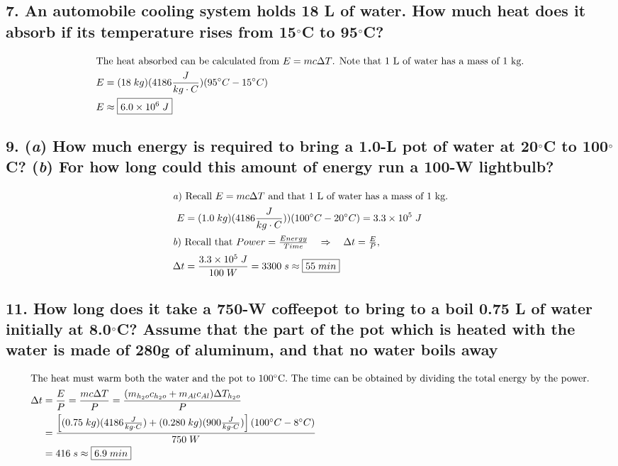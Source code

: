 \documentclass{article}
\newcommand\rr{\quad\Rightarrow\quad}
\begin{document}
\subsection*{7. An automobile cooling system holds 18 L of water. How much heat does it absorb if its temperature rises from 15$\degree$C to 95$\degree$C?}

\begin{align*}
    \intertext{The heat absorbed can be calculated from $E=mc\Delta T$. Note that 1 L of water has a mass of 1 kg.}
    E &= (18\;kg)(4186\frac{J}{kg\cdot C})(95\degree C - 15\degree C) \\  
    E &\approx \boxed{6.0 \times 10^6\;J} \\
\end{align*}

\subsection*{9. (\textit a) How much energy is required to bring a 1.0-L pot of water at 20$\degree$C to 100$\degree$C? (\textit b) For how long could this amount of energy run a 100-W lightbulb?}

\begin{align*}
    \intertext{\textit a) Recall $E = mc\Delta T$ and that 1 L of water has a mass of 1 kg.}
    E &= (1.0\;kg)(4186\frac{J}{kg\cdot C}))(100\degree C - 20\degree C) = 3.3 \times 10^5\;J \\
    \intertext{\textit b) Recall that $Power = \frac{Energy}{Time} \rr \Delta t = \frac{E}{P},$}
    \Delta t &= \frac{3.3 \times 10^5\;J}{100\;W} = 3300\;s \approx \boxed{55\;min} \\
\end{align*}

\subsection*{11. How long does it take a 750-W coffeepot to bring to a boil 0.75 L of water initially at 8.0$\degree$C? Assume that the part of the pot which is heated with the water is made of 280g of aluminum, and that no water boils away}

\begin{align*}
    \intertext{The heat must warm both the water and the pot to 100$\degree$C. The time can be obtained by dividing the total energy by the power.}     
    \Delta t &= \frac{E}{P} = \frac{mc\Delta T}{P} = \frac{(m_{h_2o}c_{h_2o} + m_{Al}c_{Al})\Delta T_{h_2o}}{P} \\
             &= \frac{\left[(0.75\;kg)(4186\frac{J}{kg\cdot C}) + (0.280\;kg)(900\frac{J}{kg\cdot C})\right](100\degree C - 8\degree C)}{750\;W} \\
             &= 416\;s \approx \boxed{6.9\;min} \\ 
\end{align*}
\end{document}

